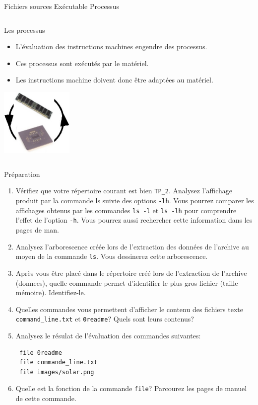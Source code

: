 \begin{frame}{Fichiers sources \textrightarrow Exécutable
    \textrightarrow Processus}
\begin{columns}
\begin{column}{3.8cm}
      \begin{block}{Les processus}
        \begin{itemize}
        \item L'évaluation des instructions machines engendre des
          processus.
        \item Ces processus sont exécutés par le matériel.
        \item Les instructions machine doivent donc être adaptées au
          matériel.
        \end{itemize}
      \end{block}
      \includegraphics[width=3.5cm]{img/s03/fichier_1_5.jpg}
    \end{column}
  \end{columns}
\end{frame}
\begin{exercice}
  \begin{exercicelet}{Préparation}
    \begin{enumerate}\setcounter{enumi}{\value{cnti}}
    \item Vérifiez que votre répertoire courant est bien
      \verb|TP_2|. Analysez l'affichage produit par la commande ls
      suivie des options \texttt{-lh}. Vous pourrez comparer les
      affichages obtenus par les commandes \texttt{ls -l} et \texttt{ls
        -lh} pour comprendre l'effet de l'option \texttt{-h}. Vous
      pourrez aussi rechercher cette information dans les pages de man.
    \item Analysez l'arborescence créée lors de l'extraction des données
      de l'archive au moyen de la commande \texttt{ls}. Vous dessinerez
      cette arborescence.
    \item Après vous être placé dans le répertoire créé lors de
      l'extraction de l'archive (donnees), quelle commande permet
      d'identifier le plus gros fichier (taille mémoire). Identifiez-le.
    \item Quelles commandes vous permettent d'afficher le contenu des
      fichiers texte \verb|command_line.txt| et \texttt{0readme}? Quels
      sont leurs contenus?
    \item Analysez le résulat de l'évaluation des commandes suivantes:
\begin{verbatim}
 file 0readme
 file commande_line.txt
 file images/solar.png
\end{verbatim}
    \item Quelle est la fonction de la commande \texttt{file}? Parcourez
      les pages de manuel de cette commande.
      \setcounter{cnti}{\value{enumi}}
    \end{enumerate}
  \end{exercicelet}
\end{exercice}

